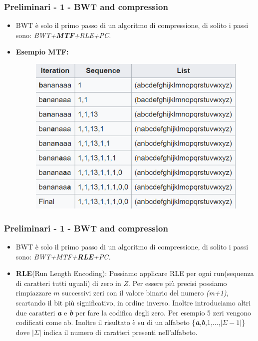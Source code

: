 \documentclass{beamer}
\begin{document}
\begin{frame}
\frametitle{Preliminari - 1 - BWT and compression}
\begin{itemize}
	\item BWT è solo il primo passo di un algoritmo di compressione, di solito i passi sono: \textit{BWT+\textbf{MTF}+RLE+PC.}\pause
	\item \textbf{Esempio MTF:}
	\begin{figure}[H]
		\centering
		\includegraphics[scale=0.5]{Immagini/MTFExample}
	\end{figure}
	
\end{itemize}
\end{frame}

\begin{frame}
\frametitle{Preliminari - 1 - BWT and compression}
\begin{itemize}
	\item BWT è solo il primo passo di un algoritmo di compressione, di solito i passi sono: \textit{BWT+MTF+\textbf{RLE}+PC.}\pause
	\item \textbf{RLE}(Run Length Encoding): Possiamo applicare RLE per ogni run(sequenza di caratteri tutti uguali) di zero in $ Z $. Per essere più precisi possiamo rimpiazzare $ m $ successivi zeri con il valore binario del numero \textit{(m+1)}, scartando il bit più significativo, in ordine inverso. Inoltre introduciamo altri due caratteri\textit{ \textbf{a}} e \textit{\textbf{b}}  per fare la codifica degli zero. Per esempio 5 zeri vengono codificati come ab. Inoltre il risultato è su di un alfabeto \{\textbf{\textit{a}},\textbf{\textit{b}},1,...,$|\Sigma-1|$\}  dove $|\Sigma|$ indica il numero di caratteri presenti nell'alfabeto.
\end{itemize}
\end{frame}
\end{document}
